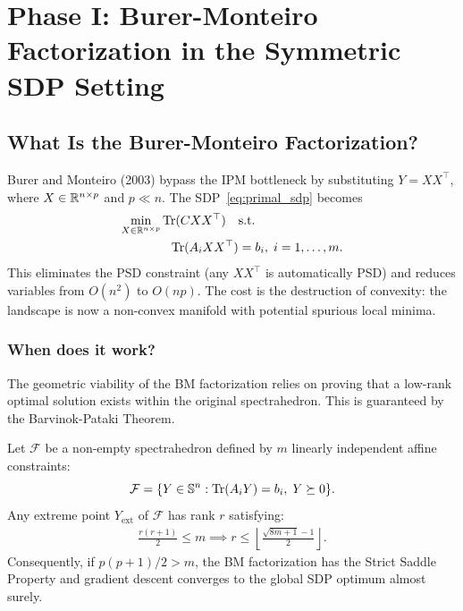\section{Phase I: Burer-Monteiro Factorization in the Symmetric SDP Setting}
\label{sec:bm_sdp}

\subsection{What Is the Burer-Monteiro Factorization?}

Burer and Monteiro (2003) bypass the IPM bottleneck by substituting $Y = XX^\top$, where
$X \in \mathbb{R}^{n \times p}$ and $p \ll n$. The SDP~\eqref{eq:primal_sdp} becomes
\begin{equation}
\begin{aligned}
  \min_{X \in \mathbb{R}^{n\times p}} \operatorname{Tr}(CXX^\top) \quad &\text{s.t.} \quad \\
  \operatorname{Tr}(A_i XX^\top) &= b_i, \; i=1,\ldots,m.
\end{aligned}
  \label{eq:bm}
\end{equation}
This eliminates the PSD constraint (any $XX^\top$ is automatically PSD) and reduces
variables from $O(n^2)$ to $O(np)$. The cost is the destruction of convexity: the landscape
is now a non-convex manifold with potential spurious local minima.

\subsubsection{When does it work?}
The geometric viability of the BM factorization relies on
proving that a low-rank optimal solution exists within the original spectrahedron. This is
guaranteed by the Barvinok-Pataki Theorem.

\begin{theorem}
  Let $\mathcal{F}$ be a non-empty spectrahedron defined by $m$ linearly independent
  affine constraints:
  \begin{equation*}
      \mathcal{F} = \{Y \in \mathbb{S}^n : \operatorname{Tr}(A_i Y) = b_i,\; Y \succeq 0\}.
  \end{equation*}
  Any extreme point $Y_{\text{ext}}$ of $\mathcal{F}$ has rank $r$ satisfying:
  \begin{equation}
  \begin{aligned}
    \frac{r(r+1)}{2} \leq m \implies 
    r \leq \left\lfloor \frac{\sqrt{8m+1}-1}{2} \right\rfloor.
  \end{aligned}
    \label{eq:pataki_bound}
  \end{equation}
  Consequently, if $p(p+1)/2 > m$, the BM factorization has the Strict Saddle Property
  and gradient descent converges to the global SDP optimum almost surely.
\end{theorem}

